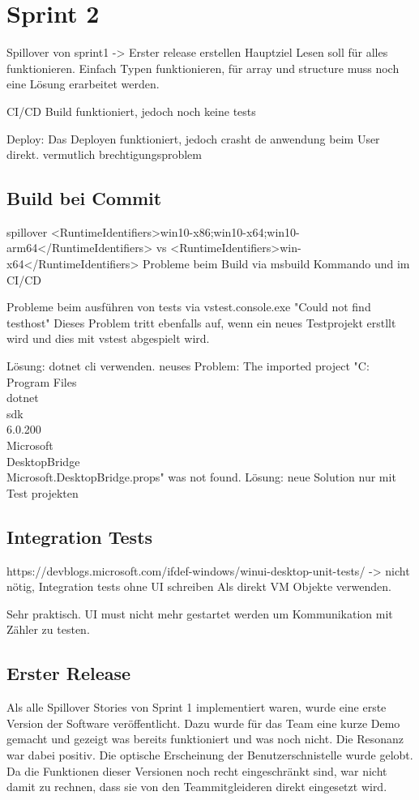 \section{Sprint 2}
Spillover von sprint1
-> Erster release erstellen Hauptziel
Lesen soll für alles funktionieren.
Einfach Typen funktionieren, für array und structure muss noch eine Lösung erarbeitet werden.

CI/CD
Build funktioniert, jedoch noch keine tests

Deploy:
Das Deployen funktioniert, jedoch crasht de anwendung beim User direkt.
vermutlich brechtigungsproblem

\subsection{Build bei Commit}\label{s2:buildOnCommit}
spillover
<RuntimeIdentifiers>win10-x86;win10-x64;win10-arm64</RuntimeIdentifiers> vs <RuntimeIdentifiers>win-x64</RuntimeIdentifiers>
Probleme beim Build via msbuild Kommando und im CI/CD

Probleme beim ausführen von tests via vstest.console.exe
"Could not find testhost"
Dieses Problem tritt ebenfalls auf, wenn ein neues Testprojekt erstllt wird und dies mit vstest abgespielt wird.

Lösung:
dotnet cli verwenden. neuses Problem:  The imported project "C:\\Program Files\\dotnet\\sdk\\6.0.200\\Microsoft\\DesktopBridge\\Microsoft.DesktopBridge.props" was not found.
Lösung:
neue Solution nur mit Test projekten

\subsection{Integration Tests}
https://devblogs.microsoft.com/ifdef-windows/winui-desktop-unit-tests/
-> nicht nötig, Integration tests ohne UI schreiben
Als direkt VM Objekte verwenden.


Sehr praktisch. UI must nicht mehr gestartet werden um Kommunikation mit Zähler zu testen.





\subsection{Erster Release}
Als alle Spillover Stories von Sprint 1 implementiert waren, wurde eine erste Version der Software veröffentlicht.
Dazu wurde für das Team eine kurze Demo gemacht und gezeigt was bereits funktioniert und was noch nicht. 
Die Resonanz war dabei positiv. Die optische Erscheinung der Benutzerschnistelle wurde gelobt.
Da die Funktionen dieser Versionen noch recht eingeschränkt sind, war nicht damit zu rechnen, dass sie von den Teammitgleideren direkt eingesetzt wird.




